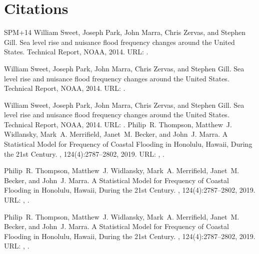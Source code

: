 \documentclass[letterpaper,10pt,english]{jupyterBook}
\begin{document}
\part{Citations}
\label{\detokenize{notebooks/FloodFrequency:citations}}
\begin{sphinxthebibliography}{SPM+14}
\sphinxAtStartPar
William Sweet, Joseph Park, John Marra, Chris Zervas, and Stephen Gill. Sea level rise and nuisance flood frequency changes around the United States. Technical Report, NOAA, 2014. URL: .

\sphinxAtStartPar
William Sweet, Joseph Park, John Marra, Chris Zervas, and Stephen Gill. Sea level rise and nuisance flood frequency changes around the United States. Technical Report, NOAA, 2014. URL: .

\sphinxAtStartPar
William Sweet, Joseph Park, John Marra, Chris Zervas, and Stephen Gill. Sea level rise and nuisance flood frequency changes around the United States. Technical Report, NOAA, 2014. URL: .
\sphinxAtStartPar
Philip R. Thompson, Matthew J. Widlansky, Mark A. Merrifield, Janet M. Becker, and John J. Marra. A Statistical Model for Frequency of Coastal Flooding in Honolulu, Hawaii, During the 21st Century. , 124(4):2787–2802, 2019. URL: , .

\sphinxAtStartPar
Philip R. Thompson, Matthew J. Widlansky, Mark A. Merrifield, Janet M. Becker, and John J. Marra. A Statistical Model for Frequency of Coastal Flooding in Honolulu, Hawaii, During the 21st Century. , 124(4):2787–2802, 2019. URL: , .

\sphinxAtStartPar
Philip R. Thompson, Matthew J. Widlansky, Mark A. Merrifield, Janet M. Becker, and John J. Marra. A Statistical Model for Frequency of Coastal Flooding in Honolulu, Hawaii, During the 21st Century. , 124(4):2787–2802, 2019. URL: , .
\end{sphinxthebibliography}







\renewcommand{\indexname}{Index}
\printindex
\end{document}
